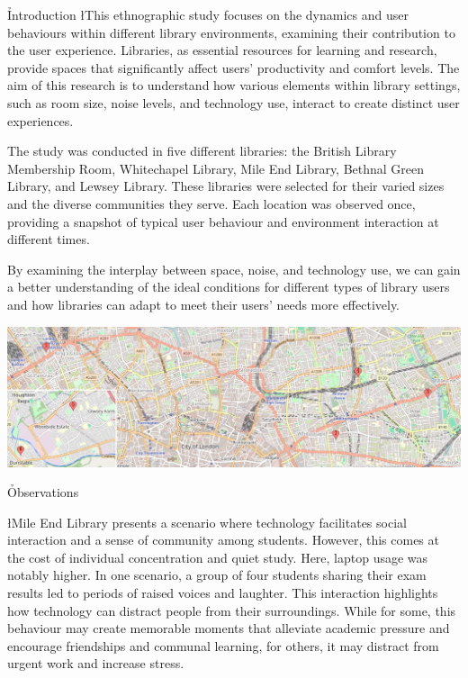 \documentclass{novel}
\title     {}
\subtitle  {}
\begin{document}
\toc

\h{Introduction}
\l{T}his ethnographic study focuses on the dynamics and user behaviours within different library environments, examining their contribution to the user experience. Libraries, as essential resources for learning and research, provide spaces that significantly affect users' productivity and comfort levels. The aim of this research is to understand how various elements within library settings, such as room size, noise levels, and technology use, interact to create distinct user experiences.

The study was conducted in five different libraries: the British Library Membership Room, Whitechapel Library, Mile End Library, Bethnal Green Library, and Lewsey Library. These libraries were selected for their varied sizes and the diverse communities they serve. Each location was observed once, providing a snapshot of typical user behaviour and environment interaction at different times.

By examining the interplay between space, noise, and technology use, we can gain a better understanding of the ideal conditions for different types of library users and how libraries can adapt to meet their users' needs more effectively.

\noindent
\includegraphics[width=\textwidth]{resources/Map2.png}

\h{Observations}


\l{M}ile End Library presents a scenario where technology facilitates social interaction and a sense of community among students. However, this comes at the cost of individual concentration and quiet study. Here, laptop usage was notably higher. In one scenario, a group of four students sharing their exam results led to periods of raised voices and laughter. This interaction highlights how technology can distract people from their surroundings. While for some, this behaviour may create memorable moments that alleviate academic pressure and encourage friendships and communal learning, for others, it may distract from urgent work and increase stress.
\end{document}
